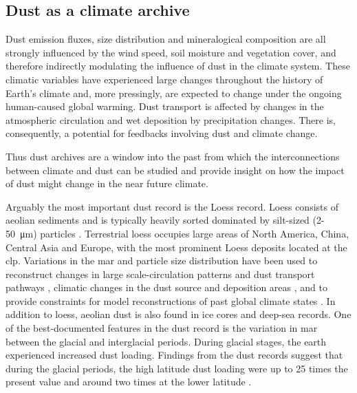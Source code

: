 \subsection{Dust as a climate archive}
Dust emission fluxes, size distribution and mineralogical composition are all strongly influenced by the wind speed, soil moisture and vegetation cover, and therefore indirectly modulating the influence of dust in the climate system. 
These climatic variables have experienced large changes throughout the history of Earth's climate and, more pressingly, are expected to change under the ongoing human-caused global warming. Dust transport is affected by changes in the atmospheric circulation and wet deposition by precipitation changes. 
There is, consequently, a potential for feedbacks involving dust and climate change.

Thus dust archives are a window into the past from which the interconnections between climate and dust can be studied and provide insight on how the impact of dust might change in the near future climate. 

Arguably the most important dust record is the Loess record. Loess consists of aeolian sediments and is typically heavily sorted dominated by silt-sized (2-\SI{50}{\micro\metre}) particles \parencite{muhs2014loess}. Terrestrial loess occupies large areas of North America, China, Central Asia and Europe, with the most prominent Loess deposits located at the \acrfull{clp}.
Variations in the \acrfull{mar} and particle size distribution have been used to reconstruct changes in large scale-circulation patterns and dust transport pathways \parencite{maher2016palaeoclimatic,ding2000re}, climatic changes in the dust source and deposition areas \parencite{shang2016variations,sun2005late}, and to provide constraints for model reconstructions of past global climate states \parencite{da2015early}. 
In addition to loess, aeolian dust is also found in ice cores and deep-sea records. One of the best-documented features in the dust record is the variation in \acrfull{mar} between the glacial and interglacial periods. 
During glacial stages, the earth experienced increased dust loading. Findings from the dust records suggest that during the glacial periods, the high latitude dust loading were up to 25 times the present value and around two times at the lower latitude \parencite{shao2011dust}.     


